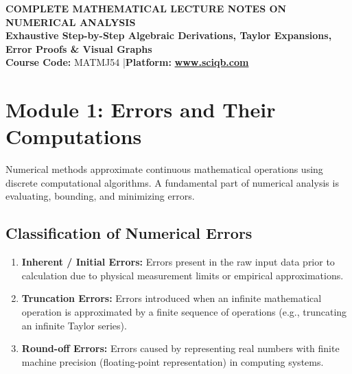 \documentclass[11pt,a4paper]{article}
\begin{document}
\begin{center}
    \begin{tcolorbox}[sharp corners, boxrule=1.5pt]
        \begin{center}
            {\Large \bfseries \color{primarynavy} COMPLETE MATHEMATICAL LECTURE NOTES ON NUMERICAL ANALYSIS}\\[4pt]
            {\large \bfseries \color{secondaryteal} Exhaustive Step-by-Step Algebraic Derivations, Taylor Expansions, Error Proofs \& Visual Graphs}\\[6pt]
            {\small \textbf{Course Code:} MATMJ54 \quad|\quad \textbf{Platform:} \href{https://www.sciqb.com}{\color{accentblue}\textbf{www.sciqb.com}}}
        \end{center}
    \end{tcolorbox}
\end{center}

\vspace{0.3cm}

\tableofcontents
\newpage

\section{Module 1: Errors and Their Computations}

Numerical methods approximate continuous mathematical operations using discrete computational algorithms. A fundamental part of numerical analysis is evaluating, bounding, and minimizing errors.

\subsection{Classification of Numerical Errors}

\begin{enumerate}
    \item \textbf{Inherent / Initial Errors:} Errors present in the raw input data prior to calculation due to physical measurement limits or empirical approximations.
    \item \textbf{Truncation Errors:} Errors introduced when an infinite mathematical operation is approximated by a finite sequence of operations (e.g., truncating an infinite Taylor series).
    \item \textbf{Round-off Errors:} Errors caused by representing real numbers with finite machine precision (floating-point representation) in computing systems.
\end{enumerate}
\end{document}
